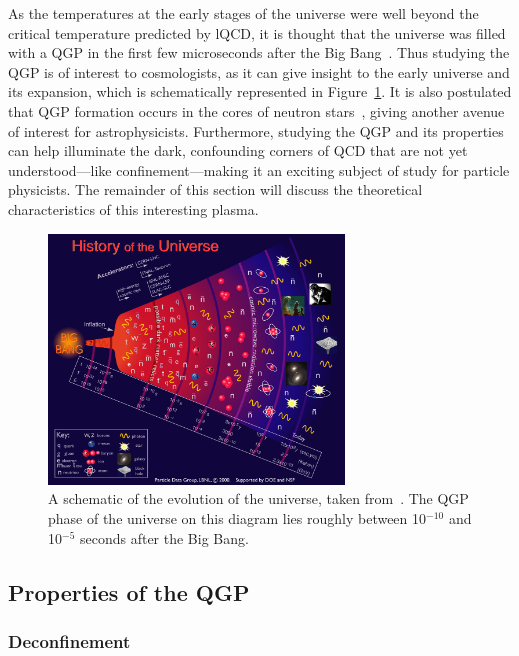As the temperatures at the early stages of the universe were well beyond the critical temperature predicted by lQCD, it is thought that the universe was filled with a QGP in the first few microseconds after the Big Bang~\cite{QGP3}. Thus studying the QGP is of interest to cosmologists, as it can give insight to the early universe and its expansion, which is schematically represented in Figure~\ref{fig:qgp_universe}. It is also postulated that QGP formation occurs in the cores of neutron stars~\cite{QGPNeutron}, giving another avenue of interest for astrophysicists. Furthermore, studying the QGP and its properties can help illuminate the dark, confounding corners of QCD that are not yet understood---like confinement---making it an exciting subject of study for particle physicists. The remainder of this section will discuss the theoretical characteristics of this interesting plasma.

\begin{figure}
    \centering
    \includegraphics[width=0.7\textwidth]{figures/introduction/qgp_universe.jpg}
    \caption{A schematic of the evolution of the universe, taken from~\cite{PDG}. The QGP phase of the universe on this diagram lies roughly between 10$^{-10}$ and 10$^{-5}$ seconds after the Big Bang.}
    \label{fig:qgp_universe}
\end{figure}

\subsection{Properties of the QGP}
\label{sec:qgp_properties}

\subsubsection{Deconfinement}

